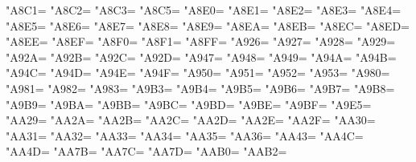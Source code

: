 \XeTeXcharclass"A8C1=\KclassCM
\XeTeXcharclass"A8C2=\KclassCM
\XeTeXcharclass"A8C3=\KclassCM
\XeTeXcharclass"A8C5=\KclassCM
\XeTeXcharclass"A8E0=\KclassCM
\XeTeXcharclass"A8E1=\KclassCM
\XeTeXcharclass"A8E2=\KclassCM
\XeTeXcharclass"A8E3=\KclassCM
\XeTeXcharclass"A8E4=\KclassCM
\XeTeXcharclass"A8E5=\KclassCM
\XeTeXcharclass"A8E6=\KclassCM
\XeTeXcharclass"A8E7=\KclassCM
\XeTeXcharclass"A8E8=\KclassCM
\XeTeXcharclass"A8E9=\KclassCM
\XeTeXcharclass"A8EA=\KclassCM
\XeTeXcharclass"A8EB=\KclassCM
\XeTeXcharclass"A8EC=\KclassCM
\XeTeXcharclass"A8ED=\KclassCM
\XeTeXcharclass"A8EE=\KclassCM
\XeTeXcharclass"A8EF=\KclassCM
\XeTeXcharclass"A8F0=\KclassCM
\XeTeXcharclass"A8F1=\KclassCM
\XeTeXcharclass"A8FF=\KclassCM
\XeTeXcharclass"A926=\KclassCM
\XeTeXcharclass"A927=\KclassCM
\XeTeXcharclass"A928=\KclassCM
\XeTeXcharclass"A929=\KclassCM
\XeTeXcharclass"A92A=\KclassCM
\XeTeXcharclass"A92B=\KclassCM
\XeTeXcharclass"A92C=\KclassCM
\XeTeXcharclass"A92D=\KclassCM
\XeTeXcharclass"A947=\KclassCM
\XeTeXcharclass"A948=\KclassCM
\XeTeXcharclass"A949=\KclassCM
\XeTeXcharclass"A94A=\KclassCM
\XeTeXcharclass"A94B=\KclassCM
\XeTeXcharclass"A94C=\KclassCM
\XeTeXcharclass"A94D=\KclassCM
\XeTeXcharclass"A94E=\KclassCM
\XeTeXcharclass"A94F=\KclassCM
\XeTeXcharclass"A950=\KclassCM
\XeTeXcharclass"A951=\KclassCM
\XeTeXcharclass"A952=\KclassCM
\XeTeXcharclass"A953=\KclassCM
\XeTeXcharclass"A980=\KclassCM
\XeTeXcharclass"A981=\KclassCM
\XeTeXcharclass"A982=\KclassCM
\XeTeXcharclass"A983=\KclassCM
\XeTeXcharclass"A9B3=\KclassCM
\XeTeXcharclass"A9B4=\KclassCM
\XeTeXcharclass"A9B5=\KclassCM
\XeTeXcharclass"A9B6=\KclassCM
\XeTeXcharclass"A9B7=\KclassCM
\XeTeXcharclass"A9B8=\KclassCM
\XeTeXcharclass"A9B9=\KclassCM
\XeTeXcharclass"A9BA=\KclassCM
\XeTeXcharclass"A9BB=\KclassCM
\XeTeXcharclass"A9BC=\KclassCM
\XeTeXcharclass"A9BD=\KclassCM
\XeTeXcharclass"A9BE=\KclassCM
\XeTeXcharclass"A9BF=\KclassCM
\XeTeXcharclass"A9E5=\KclassCM
\XeTeXcharclass"AA29=\KclassCM
\XeTeXcharclass"AA2A=\KclassCM
\XeTeXcharclass"AA2B=\KclassCM
\XeTeXcharclass"AA2C=\KclassCM
\XeTeXcharclass"AA2D=\KclassCM
\XeTeXcharclass"AA2E=\KclassCM
\XeTeXcharclass"AA2F=\KclassCM
\XeTeXcharclass"AA30=\KclassCM
\XeTeXcharclass"AA31=\KclassCM
\XeTeXcharclass"AA32=\KclassCM
\XeTeXcharclass"AA33=\KclassCM
\XeTeXcharclass"AA34=\KclassCM
\XeTeXcharclass"AA35=\KclassCM
\XeTeXcharclass"AA36=\KclassCM
\XeTeXcharclass"AA43=\KclassCM
\XeTeXcharclass"AA4C=\KclassCM
\XeTeXcharclass"AA4D=\KclassCM
\XeTeXcharclass"AA7B=\KclassCM
\XeTeXcharclass"AA7C=\KclassCM
\XeTeXcharclass"AA7D=\KclassCM
\XeTeXcharclass"AAB0=\KclassCM
\XeTeXcharclass"AAB2=\KclassCM
